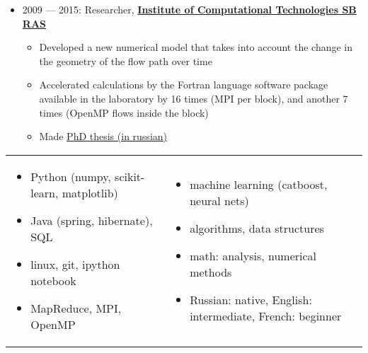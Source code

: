 \documentclass[11pt]{article}
\begin{document}
\begin{itemize}
  \item 2009 — 2015:
	Researcher, \textbf{\href{http://www.ict.nsc.ru}{Institute of Computational Technologies SB RAS}}
	\begin{itemize}
		\item Developed a new numerical model that takes into account the change in the geometry of the flow path over time
		\item Accelerated calculations by the Fortran language software package available in the laboratory by 16 times (MPI per block), and another 7 times (OpenMP flows inside the block)
		\item Made \href{https://github.com/avalur/dissertation/blob/master/to_print/autoref_Avdyushenko.pdf}{PhD thesis (in russian)}
	\end{itemize}

\end{itemize}

\begin{longtable} {p{}p{}}
\vspace{-2em}
\begin{itemize}
	\item Python (numpy, scikit-learn, matplotlib)
	\item Java (spring, hibernate), SQL
	\item linux, git, ipython notebook
	\item MapReduce, MPI, OpenMP
\end{itemize}
&
\vspace{-2em}
\begin{itemize}
	\item machine learning (catboost, neural nets)
	\item algorithms, data structures
	\item math: analysis, numerical methods
	\item Russian: native, English: intermediate, French: beginner
\end{itemize}
\\
\end{longtable}
\end{document}
